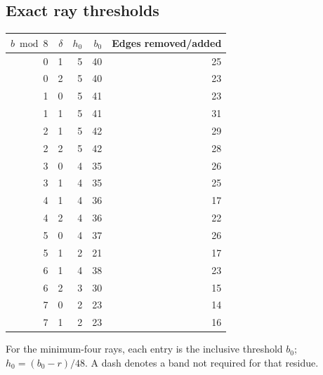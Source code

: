 \subsection{Exact ray thresholds}
\label{templates:thresholds}
\begin{longtable}{rrrrr}
$b\bmod8$ & $\delta$ & $h_0$ & $b_0$ & Edges removed/added\\\hline\endhead
0 & 1 & 5 & 40 & 25\\
0 & 2 & 5 & 40 & 23\\
1 & 0 & 5 & 41 & 23\\
1 & 1 & 5 & 41 & 31\\
2 & 1 & 5 & 42 & 29\\
2 & 2 & 5 & 42 & 28\\
3 & 0 & 4 & 35 & 26\\
3 & 1 & 4 & 35 & 25\\
4 & 1 & 4 & 36 & 17\\
4 & 2 & 4 & 36 & 22\\
5 & 0 & 4 & 37 & 26\\
5 & 1 & 2 & 21 & 17\\
6 & 1 & 4 & 38 & 23\\
6 & 2 & 3 & 30 & 15\\
7 & 0 & 2 & 23 & 14\\
7 & 1 & 2 & 23 & 16\\
\end{longtable}
For the minimum-four rays, each entry is the inclusive threshold $b_0$; $h_0=(b_0-r)/48$. A dash denotes a band not required for that residue.
